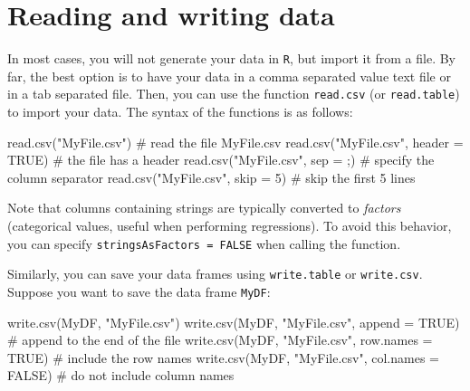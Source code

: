 \documentclass[
  letterpaper,
  DIV=11,
  numbers=noendperiod]{scrreprt}
\newenvironment{Shaded}{\begin{snugshade}}{\end{snugshade}}
\newcommand{\AttributeTok}[1]{\textcolor[rgb]{0.40,0.45,0.13}{#1}}
\newcommand{\CommentTok}[1]{\textcolor[rgb]{0.37,0.37,0.37}{#1}}
\newcommand{\ConstantTok}[1]{\textcolor[rgb]{0.56,0.35,0.01}{#1}}
\newcommand{\DecValTok}[1]{\textcolor[rgb]{0.68,0.00,0.00}{#1}}
\newcommand{\FunctionTok}[1]{\textcolor[rgb]{0.28,0.35,0.67}{#1}}
\newcommand{\NormalTok}[1]{\textcolor[rgb]{0.00,0.23,0.31}{#1}}
\newcommand{\StringTok}[1]{\textcolor[rgb]{0.13,0.47,0.30}{#1}}
\begin{document}
\hypertarget{reading-and-writing-data}{%
\section{Reading and writing data}\label{reading-and-writing-data}}

In most cases, you will not generate your data in \texttt{R}, but import
it from a file. By far, the best option is to have your data in a comma
separated value text file or in a tab separated file. Then, you can use
the function \texttt{read.csv} (or \texttt{read.table}) to import your
data. The syntax of the functions is as follows:

\begin{Shaded}
\begin{Highlighting}[]
\FunctionTok{read.csv}\NormalTok{(}\StringTok{"MyFile.csv"}\NormalTok{) }\CommentTok{\# read the file MyFile.csv}
\FunctionTok{read.csv}\NormalTok{(}\StringTok{"MyFile.csv"}\NormalTok{, }\AttributeTok{header =} \ConstantTok{TRUE}\NormalTok{) }\CommentTok{\# the file has a header}
\FunctionTok{read.csv}\NormalTok{(}\StringTok{"MyFile.csv"}\NormalTok{, }\AttributeTok{sep =} \StringTok{\textquotesingle{};\textquotesingle{}}\NormalTok{) }\CommentTok{\# specify the column separator}
\FunctionTok{read.csv}\NormalTok{(}\StringTok{"MyFile.csv"}\NormalTok{, }\AttributeTok{skip =} \DecValTok{5}\NormalTok{) }\CommentTok{\# skip the first 5 lines}
\end{Highlighting}
\end{Shaded}

Note that columns containing strings are typically converted to
\emph{factors} (categorical values, useful when performing regressions).
To avoid this behavior, you can specify
\texttt{stringsAsFactors\ =\ FALSE} when calling the function.

Similarly, you can save your data frames using \texttt{write.table} or
\texttt{write.csv}. Suppose you want to save the data frame
\texttt{MyDF}:

\begin{Shaded}
\begin{Highlighting}[]
\FunctionTok{write.csv}\NormalTok{(MyDF, }\StringTok{"MyFile.csv"}\NormalTok{) }
\FunctionTok{write.csv}\NormalTok{(MyDF, }\StringTok{"MyFile.csv"}\NormalTok{, }\AttributeTok{append =} \ConstantTok{TRUE}\NormalTok{) }\CommentTok{\# append to the end of the file }
\FunctionTok{write.csv}\NormalTok{(MyDF, }\StringTok{"MyFile.csv"}\NormalTok{, }\AttributeTok{row.names =} \ConstantTok{TRUE}\NormalTok{) }\CommentTok{\# include the row names}
\FunctionTok{write.csv}\NormalTok{(MyDF, }\StringTok{"MyFile.csv"}\NormalTok{, }\AttributeTok{col.names =} \ConstantTok{FALSE}\NormalTok{) }\CommentTok{\# do not include column names}
\end{Highlighting}
\end{Shaded}
\end{document}
